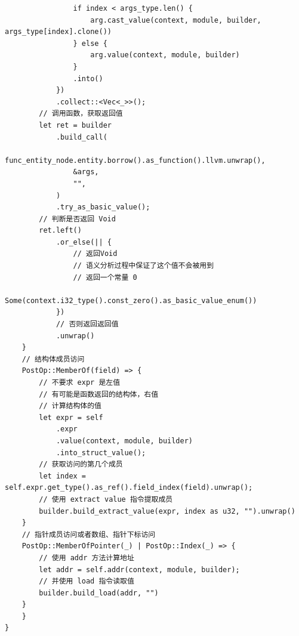 \documentclass{ctexrep}
\begin{document}
\begin{verbatim}
                if index < args_type.len() {
                    arg.cast_value(context, module, builder, args_type[index].clone())
                } else {
                    arg.value(context, module, builder)
                }
                .into()
            })
            .collect::<Vec<_>>();
        // 调用函数，获取返回值
        let ret = builder
            .build_call(
                func_entity_node.entity.borrow().as_function().llvm.unwrap(),
                &args,
                "",
            )
            .try_as_basic_value();
        // 判断是否返回 Void
        ret.left()
            .or_else(|| {
                // 返回Void
                // 语义分析过程中保证了这个值不会被用到
                // 返回一个常量 0
                Some(context.i32_type().const_zero().as_basic_value_enum())
            })
            // 否则返回返回值
            .unwrap()
    }
    // 结构体成员访问
    PostOp::MemberOf(field) => {
        // 不要求 expr 是左值
        // 有可能是函数返回的结构体，右值
        // 计算结构体的值
        let expr = self
            .expr
            .value(context, module, builder)
            .into_struct_value();
        // 获取访问的第几个成员
        let index = self.expr.get_type().as_ref().field_index(field).unwrap();
        // 使用 extract value 指令提取成员
        builder.build_extract_value(expr, index as u32, "").unwrap()
    }
    // 指针成员访问或者数组、指针下标访问
    PostOp::MemberOfPointer(_) | PostOp::Index(_) => {
        // 使用 addr 方法计算地址
        let addr = self.addr(context, module, builder);
        // 并使用 load 指令读取值
        builder.build_load(addr, "")
    }
    }
}
\end{verbatim}


\appendix


\end{document}
